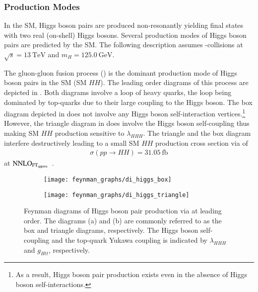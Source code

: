 \subsubsection{Production Modes}%

In the SM, Higgs boson pairs are produced non-resonantly yielding final states
with two real (on-shell) Higgs bosons. Several production modes of Higgs boson
pairs are predicted by the SM. The following description assumes \pp-collisions
at $\sqrt{s} = \SI{13}{\TeV}$ and $m_{H} = \SI{125.0}{\GeV}$.

The gluon-gluon fusion process (\ggF) is the dominant production mode of Higgs
boson pairs in the SM (SM $HH$). The leading order diagrams of this process are
depicted in . Both diagrams involve a loop of heavy
quarks, the loop being dominated by top-quarks due to their large coupling to
the Higgs boson. The box diagram depicted in 
does not involve any Higgs boson self-interaction vertices.\footnote{As a
  result, Higgs boson pair production exists even in the absence of Higgs boson
  self-interactions.} However, the triangle diagram in
 does involve the Higgs boson self-coupling
thus making SM $HH$ production sensitive to $\lambda_{HHH}$. The triangle and
the box diagram interfere destructively leading to a small SM $HH$ production
cross section via \ggF of
\begin{align*}
  \sigma(pp \to HH) = \SI{31.05}{\femto\barn}
\end{align*}
at $\text{NNLO}_{\text{FT}_{\text{approx}}}$~\cite{Grazzini:2018bsd}.

\begin{figure}[htbp]
  \centering

  \begin{subfigure}{0.49\textwidth}
    \centering
    \texttt{[image: feynman\_graphs/di\_higgs\_box]}
    \subcaption{}%
    \label{fig:dihiggs_ggf_feyn_box}
  \end{subfigure}\hfill%
  \begin{subfigure}{0.49\textwidth}
    \centering
    \texttt{[image: feynman\_graphs/di\_higgs\_triangle]}
    \subcaption{}%
    \label{fig:dihiggs_ggf_feyn_triangle}
  \end{subfigure}

  \caption{Feynman diagrams of Higgs boson pair production via \ggF at leading
    order. The diagrams (a) and (b) are commonly referred to as the box and
    triangle diagrams, respectively. The Higgs boson self-coupling and the
    top-quark Yukawa coupling is indicated by $\lambda_{HHH}$ and $g_{Htt}$,
    respectively.}%
  \label{fig:dihiggs_ggf_feyn}
\end{figure}

